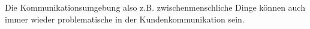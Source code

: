 \documentclass[../main.tex]{subfiles}
\begin{document}
Die Kommunikationsumgebung also z.B. zwischenmenschliche Dinge können auch immer wieder problematische in der Kundenkommunikation sein.
\end{document}
